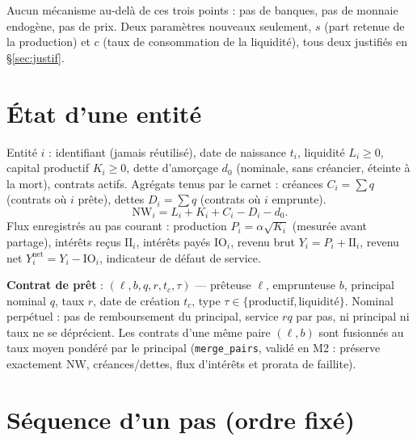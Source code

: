 \documentclass[11pt,a4paper]{article}
\newcommand{\NW}{\mathrm{NW}}
\newcommand{\code}[1]{\texttt{#1}}
\begin{document}
Aucun mécanisme au-delà de ces trois points : pas de banques, pas de monnaie
endogène, pas de prix. Deux paramètres nouveaux seulement, $s$ (part retenue de
la production) et $c$ (taux de consommation de la liquidité), tous deux
justifiés en §\ref{sec:justif}.

\section{État d'une entité}

Entité $i$ : identifiant (jamais réutilisé), date de naissance $t_i$,
liquidité $L_i \ge 0$, capital productif $K_i \ge 0$, dette d'amorçage $d_0$
(nominale, sans créancier, éteinte à la mort), contrats actifs. Agrégats tenus
par le carnet : créances $C_i = \sum q$ (contrats où $i$ prête), dettes
$D_i = \sum q$ (contrats où $i$ emprunte).
\[
\NW_i = L_i + K_i + C_i - D_i - d_0 .
\]
Flux enregistrés au pas courant : production $P_i = \alpha\sqrt{K_i}$
(mesurée avant partage), intérêts reçus $\mathrm{II}_i$, intérêts payés
$\mathrm{IO}_i$, revenu brut $Y_i = P_i + \mathrm{II}_i$, revenu net
$Y^{\mathrm{net}}_i = Y_i - \mathrm{IO}_i$, indicateur de défaut de service.

\textbf{Contrat de prêt} : $(\ell, b, q, r, t_c, \tau)$ --- prêteuse $\ell$,
emprunteuse $b$, principal nominal $q$, taux $r$, date de création $t_c$, type
$\tau \in \{\text{productif}, \text{liquidité}\}$. Nominal perpétuel : pas de
remboursement du principal, service $rq$ par pas, ni principal ni taux ne se
déprécient. Les contrats d'une même paire $(\ell, b)$ sont fusionnés au taux
moyen pondéré par le principal (\code{merge\_pairs}, validé en M2 : préserve
exactement $\NW$, créances/dettes, flux d'intérêts et prorata de faillite).

\section{Séquence d'un pas (ordre fixé)}
\label{sec:step}
\end{document}

